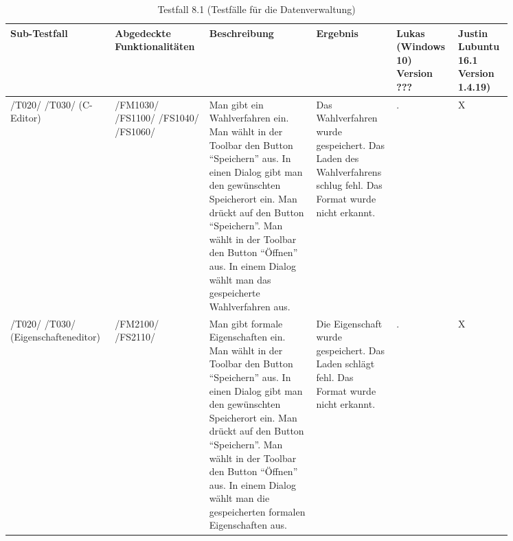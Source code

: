 \begin{table}[]
\caption{Testfall 8.1 (Testfälle für die Datenverwaltung)}
\centering
	\begin{tabular}{| p{0.15\linewidth} | p{0.15\linewidth} | p{0.20\linewidth} |
	p{0.15\linewidth} | p{0.1\linewidth} | p{0.1\linewidth} |}
	\hline
	\textbf{Sub-Testfall} &
	\textbf{Abgedeckte Funktionalitäten} &
	\textbf{Beschreibung} &
	\textbf{Ergebnis} & \textbf{Lukas}
	(Windows 10) Version ??? &
	\textbf{Justin} Lubuntu 16.1 Version 1.4.19) 
\\
\hline
/T020/ /T030/ (C-Editor) &
/FM1030/ /FS1100/ /FS1040/ /FS1060/ &
Man gibt ein Wahlverfahren ein. Man wählt in der Toolbar den Button "`Speichern"' aus. In einen Dialog gibt man den gewünschten Speicherort ein. Man drückt auf den Button "`Speichern"'. Man wählt in der Toolbar den Button "`Öffnen"' aus. In einem Dialog wählt man das gespeicherte Wahlverfahren aus.
 &
Das Wahlverfahren wurde gespeichert. Das Laden des Wahlverfahrens schlug fehl. Das Format wurde nicht erkannt. &
\centering . & X
\\
\hline 
/T020/ /T030/ (Eigenschafteneditor) &
/FM2100/ /FS2110/ &
Man gibt formale Eigenschaften ein. Man wählt in der Toolbar den Button "`Speichern"' aus. In einen Dialog gibt man den gewünschten Speicherort ein. Man drückt auf den Button "`Speichern"'. Man wählt in der Toolbar den Button "`Öffnen"' aus. In einem Dialog wählt man die gespeicherten formalen Eigenschaften aus.
 &
Die Eigenschaft wurde gespeichert. Das Laden schlägt fehl. Das Format wurde nicht erkannt. &
\centering . & X
\\
\hline 


\end{tabular}
\end{table}